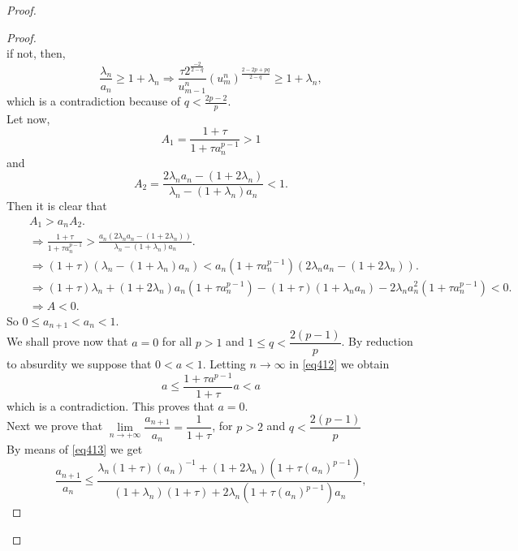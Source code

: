 \documentclass[a4paper,12pt,english,reqno]{smfart}
\begin{document}
\begin{proof}
\begin{proof}
\begin{equation*}
			\end{equation*}
			if not, then, 
			\begin{equation*}
			\dfrac{\lambda_{n}}{a_{n}}\geq 1+\lambda_{n} \Rightarrow \frac{\tau 2^{\frac{-2}{2-q}}}{u_{m-1}^{n}}\left(u_{m}^{n}\right)^{\frac{2-2p+pq}{2-q}}\geq 1+\lambda_{n},
			\end{equation*}
			which is a contradiction because of $q<\frac{2p-2}{p}.$\\
			Let now, 
			\begin{equation*}
			A_{1}=\frac{1+\tau}{1+\tau a_{n}^{p-1}}>1
			\end{equation*}
			and
			\begin{equation*}
			A_{2}=\frac{2\lambda_{n}a_{n}-(1+2\lambda_{n})}{\lambda_{n}-(1+\lambda_{n})a_{n}}<1.
			\end{equation*}
			Then it is clear that
			\begin{eqnarray*}
				&& A_{1}> a_{n}A_{2}.\\
				&&\Rightarrow \frac{1+\tau}{1+\tau a_{n}^{p-1}} > \frac{a_{n}(2\lambda_{n}a_{n}-(1+2\lambda_{n}))}{\lambda_{n}-(1+\lambda_{n})a_{n}}.\\
				&&\Rightarrow (1+\tau)(\lambda_{n}-(1+\lambda_{n})a_{n}) < a_{n} (1+\tau a_{n}^{p-1})(2\lambda_{n}a_{n}-(1+2\lambda_{n})).\\
				&&\Rightarrow (1+\tau)\lambda_{n}+(1+2\lambda_{n})a_{n}(1+\tau a_{n}^{p-1})-(1+\tau)(1+\lambda_{n}a_{n})-2\lambda_{n}a_{n}^{2}(1+\tau a_{n}^{p-1})< 0.\\
				&&\Rightarrow A< 0.
			\end{eqnarray*}
			So $0\leq a_{n+1} < a_{n} < 1.$\\
			We shall prove now that $a=0$ for all $p>1$ and $1\leq q<\dfrac{2(p-1)}{p}$. By reduction to absurdity we suppose that $0<a<1$. Letting $n\rightarrow \infty $ in \eqref{eq412} we obtain 
			\begin{equation*}
			a \leq \dfrac{1+\tau a^{p-1}}{1+\tau}a <a
			\end{equation*}
			which is a contradiction. This proves that $a=0.$\\
			Next we prove that $\lim\limits_{n\rightarrow+\infty}\dfrac{a_{n+1}}{a_{n}}=\dfrac{1}{1+\tau}$, for $p>2$ and $q<\dfrac{2(p-1)}{p}$\\
			By means of \eqref{eq413} we get
			\begin{equation}
			\frac{a_{n+1}}{a_{n}}\leq
			\frac{\lambda_{n}(1+\tau)(a_{n})^{-1}+(1+2\lambda_{n})(1+\tau(a_{n})^{p-1})}{(1+\lambda_{n})(1+\tau)+2\lambda_{n}(1+\tau(a_{n})^{p-1})a_{n}},

\end{equation}
\end{proof}
\end{proof}
\end{document}
